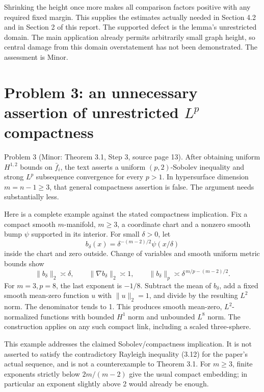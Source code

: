 \documentclass[10pt]{article}
\begin{document}
Shrinking the height once more makes all comparison factors positive with any required fixed margin. This supplies the estimates actually needed in Section 4.2 and in Section 2 of this report. The supported defect is the lemma’s unrestricted domain. The main application already permits arbitrarily small graph height, so central damage from this domain overstatement has not been demonstrated. The assessment is Minor.\par
\section*{Problem 3: an unnecessary assertion of unrestricted \(L^p\) compactness}
Problem 3 (Minor: Theorem 3.1, Step 3, source page 13).  After obtaining uniform \(H^{1,2}\) bounds on \(\bar f_i\), the text asserts a uniform \((p,2)\)-Sobolev inequality and strong \(L^p\) subsequence convergence for every \(p>1\). In hypersurface dimension \(m=n-1\geq3\), that general compactness assertion is false. The argument needs substantially less.\par
Here is a complete example against the stated compactness implication. Fix a compact smooth \(m\)-manifold, \(m\geq3\), a coordinate chart and a nonzero smooth bump \(\psi\) supported in its interior. For small \(\delta>0\), let \[b_\delta(x)=\delta^{-(m-2)/2}\psi(x/\delta)\] inside the chart and zero outside. Change of variables and smooth uniform metric bounds show \[\|b_\delta\|_2\asymp\delta,\qquad
 \|\nabla b_\delta\|_2\asymp1,\qquad
 \|b_\delta\|_p\asymp
 \delta^{\,m/p-(m-2)/2}.\] For \(m=3,p=8\), the last exponent is \(-1/8\). Subtract the mean of \(b_\delta\), add a fixed smooth mean-zero function \(u\) with \(\|u\|_2=1\), and divide by the resulting \(L^2\) norm. The denominator tends to 1. This produces smooth mean-zero, \(L^2\)-normalized functions with bounded \(H^1\) norm and unbounded \(L^8\) norm. The construction applies on any such compact link, including a scaled three-sphere.\par
This example addresses the claimed Sobolev/compactness implication. It is not asserted to satisfy the contradictory Rayleigh inequality (3.12) for the paper’s actual sequence, and is not a counterexample to Theorem 3.1. For \(m\geq3\), finite exponents strictly below \(2m/(m-2)\) give the usual compact embedding; in particular an exponent slightly above 2 would already be enough.\par
\end{document}
